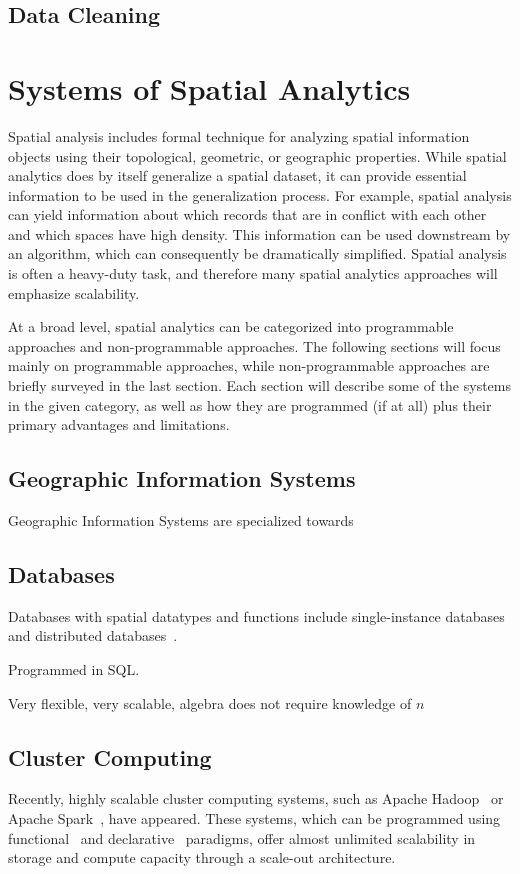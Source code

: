 \documentclass[11pt, oneside]{report}
\begin{document}
{\subsection{Data Cleaning}

\section{Systems of Spatial Analytics}
Spatial analysis includes formal technique for analyzing spatial information objects using their topological, geometric, or geographic properties. While spatial analytics does by itself generalize a spatial dataset, it can provide essential information to be used in the generalization process. For example, spatial analysis can yield information about which records that are in conflict with each other and which spaces have high density. This information can be used downstream by an algorithm, which can consequently be dramatically simplified. Spatial analysis is often a heavy-duty task, and therefore many spatial analytics approaches will emphasize scalability. 

At a broad level, spatial analytics can be categorized into programmable approaches and non-programmable approaches. The following sections will focus mainly on programmable approaches, while non-programmable approaches are briefly surveyed in the last section. Each section will describe some of the systems in the given category, as well as how they are programmed (if at all) plus their primary advantages and limitations.


\subsection{Geographic Information Systems}

Geographic Information Systems are specialized towards 

\subsection{Databases}
Databases with spatial datatypes and functions include single-instance databases~\cite{postgresql,mssql,oracle} and distributed databases~\cite{greenplum, vertica}.

Programmed in SQL.

Very flexible, very scalable, algebra does not require knowledge of $n$

\subsection{Cluster Computing}
Recently, highly scalable cluster computing systems, such as Apache Hadoop~\cite{apachehadoop} or Apache Spark~\cite{zaharia2010spark}, have appeared. These systems, which can be programmed using functional~\cite{dean04mapreduce, epfl2014scala} and declarative~\cite{olston2008pig,thusoo2010hive} paradigms, offer almost unlimited scalability in storage and compute capacity through a scale-out architecture. 

}
\end{document}
